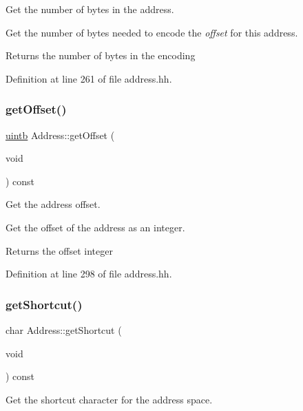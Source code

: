 Get the number of bytes in the address. 

Get the number of bytes needed to encode the {\itshape offset} for this address. \begin{DoxyReturn}{Returns}
the number of bytes in the encoding 
\end{DoxyReturn}


Definition at line 261 of file address.\+hh.

\mbox{\label{class_address_a208ce07ecf27e5c148d8395913831c2a}} 
\subsubsection{\texorpdfstring{getOffset()}{getOffset()}}
{\footnotesize\ttfamily \mbox{\hyperlink{types_8h_a2db313c5d32a12b01d26ac9b3bca178f}{uintb}} Address\+::get\+Offset (\begin{DoxyParamCaption}\item[{void}]{ }\end{DoxyParamCaption}) const\hspace{0.3cm}{\ttfamily [inline]}}



Get the address offset. 

Get the offset of the address as an integer. \begin{DoxyReturn}{Returns}
the offset integer 
\end{DoxyReturn}


Definition at line 298 of file address.\+hh.

\mbox{\label{class_address_a00559098470f2e6da27c07cdda47d1ea}} 
\subsubsection{\texorpdfstring{getShortcut()}{getShortcut()}}
{\footnotesize\ttfamily char Address\+::get\+Shortcut (\begin{DoxyParamCaption}\item[{void}]{ }\end{DoxyParamCaption}) const\hspace{0.3cm}{\ttfamily [inline]}}



Get the shortcut character for the address space. 


